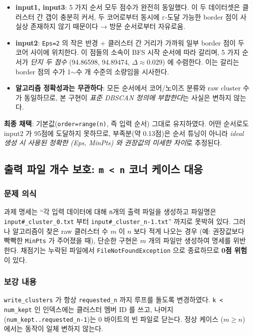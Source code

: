 \documentclass[12pt, a4paper]{article}
\begin{document}
\begin{itemize}
    \item \textbf{input1, input3}: 5 가지 순서 모두 점수가 완전히 동일했다. 이 두 데이터셋은 클러스터 간 갭이 충분히 커서, 두 코어로부터 동시에 $\varepsilon$-도달 가능한 border 점이 사실상 존재하지 않기 때문이다 → 방문 순서로부터 자유로움.
    \item \textbf{input2}: \texttt{Eps=2} 의 작은 반경 + 클러스터 간 거리가 가까워 일부 border 점이 두 코어 사이에 위치한다. 이 점들의 소속이 BFS 시작 순서에 따라 갈리며, 5 가지 순서가 \emph{단지 두 점수} (94.86598, 94.89474, $\Delta \approx 0.029$) 에 수렴한다. 이는 갈리는 border 점의 수가 1$\sim$수 개 수준의 소량임을 시사한다.
    \item \textbf{알고리즘 정확성과는 무관하다}: 모든 순서에서 코어/노이즈 분류와 raw cluster 수가 동일하므로, 본 구현이 \emph{표준 DBSCAN 정의에 부합한다}는 사실은 변하지 않는다.
\end{itemize}

\noindent\textbf{최종 채택}: 기본값(\texttt{order=range(n)}, 즉 입력 순서) 그대로 유지하였다. 어떤 순서로도 input2 가 95점에 도달하지 못하므로, 부족분(약 0.13점)은 순서 튜닝이 아니라 \emph{ideal 생성 시 사용된 정확한 (Eps, MinPts) 와 권장값의 미세한 차이}로 추정된다.


\subsection{출력 파일 개수 보호: \texttt{m < n} 코너 케이스 대응}
\label{sec:guard}

\subsubsection*{문제 의식}

과제 명세는 ``각 입력 데이터에 대해 \texttt{n}개의 출력 파일을 생성하고 파일명은 \texttt{input\#\_cluster\_0.txt} 부터 \texttt{input\#\_cluster\_n-1.txt}'' 까지로 못박혀 있다. 그러나 알고리즘이 찾은 raw 클러스터 수 $m$ 이 $n$ 보다 적게 나오는 경우 (예: 권장값보다 빡빡한 \texttt{MinPts} 가 주어졌을 때), 단순한 구현은 $m$ 개의 파일만 생성하여 명세를 위반한다. 채점기는 누락된 파일에서 \texttt{FileNotFoundException} 으로 종료하므로 \textbf{0점 위험}이 있다.

\subsubsection*{보강 내용}

\texttt{write\_clusters} 가 항상 \texttt{requested\_n} 까지 루프를 돌도록 변경하였다. \texttt{k < num\_kept} 인 인덱스에는 클러스터 멤버 ID 를 쓰고, 나머지(\texttt{num\_kept..requested\_n-1})는 0 바이트의 빈 파일로 닫는다. 정상 케이스 ($m \ge n$) 에서는 동작이 일체 변하지 않는다.
\end{document}
